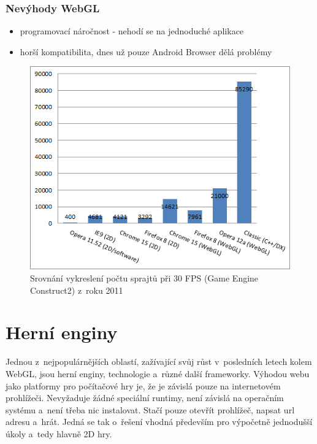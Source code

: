 \documentclass[12pt,a4paper,titlepage,final]{report}
\begin{document}
\subsubsection{Nevýhody WebGL}
\begin{itemize}
	\item programovací náročnost - nehodí se na jednoduché aplikace
	\item horší kompatibilita, dnes už pouze Android Browser dělá problémy
\end{itemize}





\begin{figure}[ht]
\begin{center}

\includegraphics[width=12cm]{images/allperf-graph.png}
\caption{Srovnání vykreslení počtu sprajtů při 30 FPS (Game Engine Construct2) z~roku 2011}
\label{fig:theory}
\end{center}
\end{figure}

\section{Herní enginy}

Jednou z~nejpopulárnějších oblastí, zažívající svůj růst v~posledních letech kolem WebGL, jsou herní enginy, technologie a~různé další frameworky. Výhodou webu jako platformy pro počítačové hry je, že je závislá pouze na internetovém prohlížeči. Nevyžaduje žádné speciální runtimy, není závislá na operačním systému a~není třeba nic instalovat. Stačí pouze otevřít prohlížeč, napsat url adresu a~hrát. Jedná se tak o~řešení vhodná především pro výpočetně jednodušší úkoly a~tedy 
hlavně 2D hry.
\end{document}
